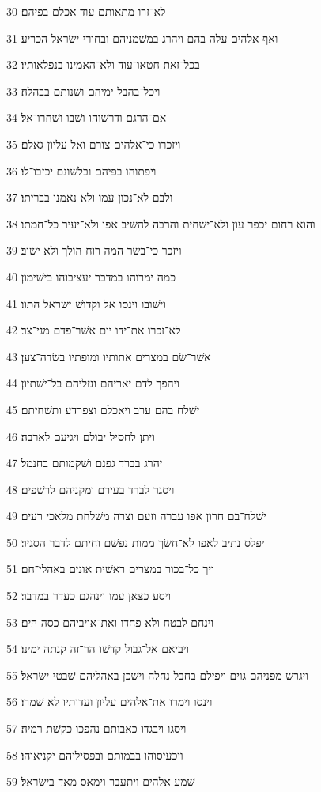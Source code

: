 \par 30 לא־זרו מתאותם עוד אכלם בפיהם׃
\par 31 ואף אלהים עלה בהם ויהרג במשׁמניהם ובחורי ישׂראל הכריע׃
\par 32 בכל־זאת חטאו־עוד ולא־האמינו בנפלאותיו׃
\par 33 ויכל־בהבל ימיהם ושׁנותם בבהלה׃
\par 34 אם־הרגם ודרשׁוהו ושׁבו ושׁחרו־אל׃
\par 35 ויזכרו כי־אלהים צורם ואל עליון גאלם׃
\par 36 ויפתוהו בפיהם ובלשׁונם יכזבו־לו׃
\par 37 ולבם לא־נכון עמו ולא נאמנו בבריתו׃
\par 38 והוא רחום יכפר עון ולא־ישׁחית והרבה להשׁיב אפו ולא־יעיר כל־חמתו׃
\par 39 ויזכר כי־בשׂר המה רוח הולך ולא ישׁוב׃
\par 40 כמה ימרוהו במדבר יעציבוהו בישׁימון׃
\par 41 וישׁובו וינסו אל וקדושׁ ישׂראל התוו׃
\par 42 לא־זכרו את־ידו יום אשׁר־פדם מני־צר׃
\par 43 אשׁר־שׂם במצרים אתותיו ומופתיו בשׂדה־צען׃
\par 44 ויהפך לדם יאריהם ונזליהם בל־ישׁתיון׃
\par 45 ישׁלח בהם ערב ויאכלם וצפרדע ותשׁחיתם׃
\par 46 ויתן לחסיל יבולם ויגיעם לארבה׃
\par 47 יהרג בברד גפנם ושׁקמותם בחנמל׃
\par 48 ויסגר לברד בעירם ומקניהם לרשׁפים׃
\par 49 ישׁלח־בם חרון אפו עברה וזעם וצרה משׁלחת מלאכי רעים׃
\par 50 יפלס נתיב לאפו לא־חשׂך ממות נפשׁם וחיתם לדבר הסגיר׃
\par 51 ויך כל־בכור במצרים ראשׁית אונים באהלי־חם׃
\par 52 ויסע כצאן עמו וינהגם כעדר במדבר׃
\par 53 וינחם לבטח ולא פחדו ואת־אויביהם כסה הים׃
\par 54 ויביאם אל־גבול קדשׁו הר־זה קנתה ימינו׃
\par 55 ויגרשׁ מפניהם גוים ויפילם בחבל נחלה וישׁכן באהליהם שׁבטי ישׂראל׃
\par 56 וינסו וימרו את־אלהים עליון ועדותיו לא שׁמרו׃
\par 57 ויסגו ויבגדו כאבותם נהפכו כקשׁת רמיה׃
\par 58 ויכעיסוהו בבמותם ובפסיליהם יקניאוהו׃
\par 59 שׁמע אלהים ויתעבר וימאס מאד בישׂראל׃

